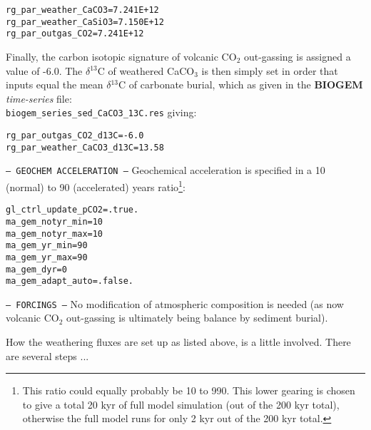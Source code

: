 \documentclass[10pt,twoside]{article}
\begin{document}
\begin{compactitem}
\begin{verbatim}
rg_par_weather_CaCO3=7.241E+12
rg_par_weather_CaSiO3=7.150E+12
rg_par_outgas_CO2=7.241E+12
                \end{verbatim}\vspace{-5pt}
Finally, the carbon isotopic signature of volcanic CO$_{2}$ out-gassing is assigned a value of -6.0\permil. The $\delta$$^{13}$C of weathered CaCO$_{3}$ is then simply set in order that inputs equal the mean $\delta$$^{13}$C of carbonate burial, which as given in the \textbf{BIOGEM} \textit{time-series} file:
\\\texttt{biogem\_series\_sed\_CaCO3\_13C.res}
giving:
\vspace{-5pt}\begin{verbatim}
rg_par_outgas_CO2_d13C=-6.0
rg_par_weather_CaCO3_d13C=13.58
\end{verbatim}\vspace{-5pt}
                \item \texttt{--- GEOCHEM ACCELERATION ---}
Geochemical acceleration is specified in a 10 (normal) to 90 (accelerated) years ratio\footnote{This ratio could equally probably be 10 to 990. This lower gearing is chosen to give a total 20 kyr of full model simulation (out of the 200 kyr total), otherwise the full model runs for only 2 kyr out of the 200 kyr total.}:
\vspace{-5pt}\begin{verbatim}
gl_ctrl_update_pCO2=.true.
ma_gem_notyr_min=10
ma_gem_notyr_max=10
ma_gem_yr_min=90
ma_gem_yr_max=90
ma_gem_dyr=0
ma_gem_adapt_auto=.false.
\end{verbatim}\vspace{-5pt}
\item \texttt{--- FORCINGS ---}
No modification of atmospheric composition is needed (as now volcanic CO$_{2}$ out-gassing is ultimately being balance by sediment burial).
\end{compactitem}

How the weathering fluxes are set up as listed above, is a little involved. There are several steps ...
\end{document}
